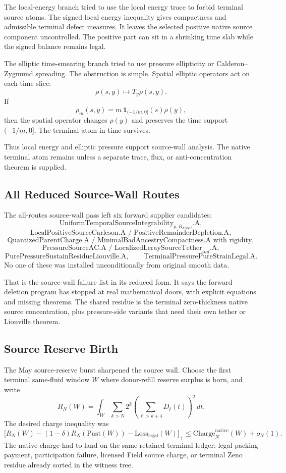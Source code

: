 The local-energy branch tried to use the local energy trace to forbid terminal
source atoms.
The signed local energy inequality gives compactness and admissible terminal
defect measures.
It leaves the selected positive native source component uncontrolled.
The positive part can sit in a shrinking time slab while the signed balance
remains legal.

The elliptic time-smearing branch tried to use pressure ellipticity or
Calderon--Zygmund spreading.
The obstruction is simple.
Spatial elliptic operators act on each time slice:
\[
  \rho(s,y)\longmapsto T_y\rho(s,y).
\]
If
\[
  \rho_m(s,y)=m\,\mathbf 1_{(-1/m,0]}(s)\rho(y),
\]
then the spatial operator changes \(\rho(y)\) and preserves the time support
\((-1/m,0]\).
The terminal atom in time survives.

Thus local energy and elliptic pressure support source-wall analysis.
The native terminal atom remains unless a separate trace, flux, or
anti-concentration theorem is supplied.

\subsection{All Reduced Source-Wall Routes}

The all-routes source-wall pass left six forward supplier candidates:
\[
  \text{UniformTemporalSourceIntegrability}_{p,B_{\mathrm{ASAC}}}\text{.A},
\]
\[
  \text{LocalPositiveSourceCarleson.A / PositiveRemainderDepletion.A},
\]
\[
  \text{QuantizedParentCharge.A / MinimalBadAncestryCompactness.A with rigidity},
\]
\[
  \text{PressureSourceAC.A / LocalizedLeraySourceTether}_{ind}\text{.A},
\]
\[
  \text{PurePressureSustainResidueLiouville.A},
  \qquad
  \text{TerminalPressurePureStrainLegal.A}.
\]
No one of these was installed unconditionally from original smooth data.

That is the source-wall failure list in its reduced form.
It says the forward deletion program has stopped at real mathematical doors,
with explicit equations and missing theorems.
The shared residue is the terminal zero-thickness native source concentration,
plus pressure-side variants that need their own tether or Liouville theorem.

\subsection{Source Reserve Birth}

The May source-reserve burst sharpened the source wall.
Choose the first terminal same-fluid window \(W\) where donor-refill reserve
surplus is born, and write
\[
  R_N(W)
  =
  \int_W\sum_{k>N}2^k
  \left(\sum_{\ell>k+4}D_\ell(t)\right)^2\,dt .
\]
The desired charge inequality was
\[
  \bigl[
    R_N(W)
    -(1-\delta)R_N(\mathrm{Past}(W))
    -\mathrm{Loss}_{\mathrm{legal}}(W)
  \bigr]_+
  \le
  \mathrm{Charge}^{\mathrm{native}}_N(W)+o_N(1).
\]
The native charge had to land on the same retained terminal ledger:
legal packing payment, participation failure, licensed Field source charge, or
terminal Zeno residue already sorted in the witness tree.


